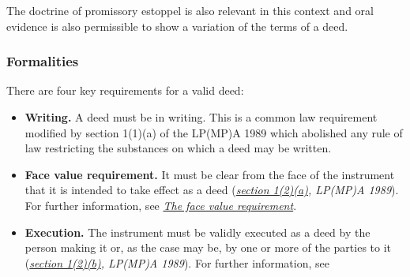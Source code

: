\documentclass[
]{article}
\providecommand{\tightlist}{%
  \setlength{\itemsep}{0pt}\setlength{\parskip}{0pt}}
\begin{document}
The doctrine of promissory estoppel is also relevant in this context and
oral evidence is also permissible to show a variation of the terms of a
deed.

\hypertarget{formalities}{%
\subsubsection{Formalities}\label{formalities}}

There are four key requirements for a valid deed:

\begin{itemize}
\tightlist
\item
  \textbf{Writing.} A deed must be in writing. This is a common law
  requirement modified by section 1(1)(a) of the LP(MP)A 1989 which
  abolished any rule of law restricting the substances on which a deed
  may be written.
\item
  \textbf{Face value requirement.} It must be clear from the face of the
  instrument that it is intended to take effect as a deed
  (\emph{\href{https://uk.practicallaw.thomsonreuters.com/7-505-7361?originationContext=document\&transitionType=PLDocumentLink\&contextData=(sc.Default)\&ppcid=0e69ecc7bd0b425c8c07be4517611bac}{section
  1(2)(a)}, LP(MP)A 1989}). For further information, see
  \emph{\href{https://uk.practicallaw.thomsonreuters.com/Document/I2a05f3d71cb811e38578f7ccc38dcbee/View/FullText.html?navigationPath=Search\%2Fv1\%2Fresults\%2Fnavigation\%2Fi0ad6ad3f000001841ed7d74a8e6914e1\%3Fppcid\%3D6c2ae8a868b54456ac4cdc97bf99f24b\%26Nav\%3DKNOWHOW_UK\%26fragmentIdentifier\%3DI2a05f3d71cb811e38578f7ccc38dcbee\%26parentRank\%3D0\%26startIndex\%3D1\%26contextData\%3D\%2528sc.Search\%2529\%26transitionType\%3DSearchItem\&listSource=Search\&listPageSource=c156b6df63e9ac1dbe2bd9174c514051\&list=KNOWHOW_UK\&rank=2\&sessionScopeId=d84126a1818ed3fb6e1aadaf57885dfabcc9a95b48d8801a1ae90e19604d0dc0\&ppcid=6c2ae8a868b54456ac4cdc97bf99f24b\&originationContext=Search\%20Result\&transitionType=SearchItem\&contextData=(sc.Search)\&navId=DADDF17324157881A30EF74E4476B30F\&comp=pluk\#co_anchor_a243821}{The
  face value requirement}}.
\item
  \textbf{Execution.} The instrument must be validly executed as a deed
  by the person making it or, as the case may be, by one or more of the
  parties to it
  (\emph{\href{https://uk.practicallaw.thomsonreuters.com/7-505-7361?originationContext=document\&transitionType=PLDocumentLink\&contextData=(sc.Default)\&ppcid=0e69ecc7bd0b425c8c07be4517611bac}{section
  1(2)(b)}, LP(MP)A 1989}). For further information, see

\end{itemize}
\end{document}
